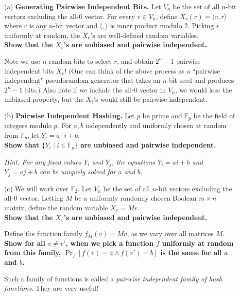 \documentclass{article}
\def \F {{\mathbb F}}
\begin{document}
\begin{enumerate}

\item[(a)] {\bf Generating Pairwise Independent Bits.} Let $V_n$ be the set of all $n$-bit vectors excluding the all-$0$ vector. For every $v \in V_n$,
define $X_v (r) = \langle v, r \rangle$ where $r$ is any $n$-bit vector and $\langle,\rangle$ is inner product modulo $2$. Picking $r$ uniformly at random, the $X_v$'s are well-defined random variables. \\
{\bf Show that the $X_v$'s are unbiased and pairwise independent.} 

Note we use $n$ random bits to select $r$, and obtain $2^n - 1$ pairwise independent bits $X_v$! (One can think of the above process as a ``pairwise independent" pseudorandom generator that takes an $n$-bit seed and produces $2^n-1$ bits.)
Also note if we include the all-$0$ vector in $V_n$, we would lose the unbiased property, but the $X_i$'s would still be pairwise independent. \end{enumerate} 
\begin{enumerate}
\item[(b)] {\bf Pairwise Independent Hashing.} Let $p$ be prime and $\F_p$ be the field of integers modulo $p$. For $a, b$ independently
and uniformly chosen at random from $\F_p$, let $Y_i = a\cdot i+b $.\\
{\bf  Show that $\{Y_i \mid i\in \F_p \}$ are unbiased and pairwise independent.}

{\em Hint: For any fixed values $Y_i$ and $Y_j$, the equations $Y_i = ai+b $ and $Y_j = aj+b $ can be uniquely solved for $a$ and $b$.}  \end{enumerate} 
\begin{enumerate}
\item[(c)] We will work over $\F_2$. Let $V_n$ be the set of all $n$-bit vectors excluding the all-$0$ vector. 
Letting $M$ be a uniformly randomly chosen Boolean $m \times n$ matrix, define the random variable $X_v = Mv$. \\
{\bf Show that the $X_v$'s are unbiased and pairwise independent.}

Define the function family $f_M (v) = Mv$, as we vary over all matrices $M$. \\
{\bf Show for all $v \neq v'$, when we pick a function $f$ uniformly at random from this
family, $\Pr_f[ f(v)=a \wedge f(v')=b]$ is the same for all $a$ and $b$.}

Such a family of functions is called a {\em pairwise independent family of hash
functions}. They are very useful! 
\end{enumerate} 
\end{document}

